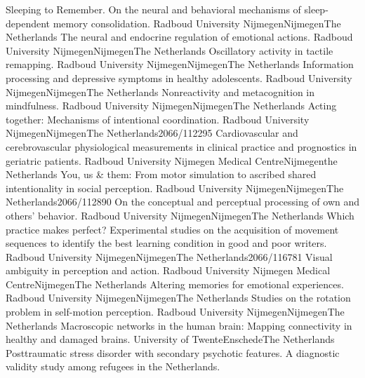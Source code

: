 	{Sleeping to Remember. On the neural and behavioral mechanisms of sleep-dependent memory consolidation.}
	{Radboud University Nijmegen}{Nijmegen}{The Netherlands}{}
	{The neural and endocrine regulation of emotional actions.}
	{Radboud University Nijmegen}{Nijmegen}{The Netherlands}{}
	{Oscillatory activity in tactile remapping.}
	{Radboud University Nijmegen}{Nijmegen}{The Netherlands}{}
	{Information processing and depressive symptoms in healthy adolescents.}
	{Radboud University Nijmegen}{Nijmegen}{The Netherlands}{}
	{Nonreactivity and metacognition in mindfulness.}
	{Radboud University Nijmegen}{Nijmegen}{The Netherlands}{}
	{Acting together: Mechanisms of intentional coordination.}
	{Radboud University Nijmegen}{Nijmegen}{The Netherlands}{2066/112295}
	{Cardiovascular and cerebrovascular physiological measurements in clinical practice and prognostics in geriatric patients.}
	{Radboud University Nijmegen Medical Centre}{Nijmegen}{the Netherlands}{}
	{ You, us & them: From motor simulation to ascribed shared intentionality in social perception.}
	{Radboud University Nijmegen}{Nijmegen}{The Netherlands}{2066/112890}
	{On the conceptual and perceptual processing of own and others’ behavior.}
	{Radboud University Nijmegen}{Nijmegen}{The Netherlands}{}
	{Which practice makes perfect? Experimental studies on the acquisition of movement sequences to identify the best learning condition in good and poor writers.}
	{Radboud University Nijmegen}{Nijmegen}{The Netherlands}{2066/116781}
	{Visual ambiguity in perception and action.}
	{Radboud University Nijmegen Medical Centre}{Nijmegen}{The Netherlands}{}
	{Altering memories for emotional experiences.}
	{Radboud University Nijmegen}{Nijmegen}{The Netherlands}{}
	{ Studies on the rotation problem in self-motion perception.}
	{Radboud University Nijmegen}{Nijmegen}{The Netherlands}{}
	{ Macroscopic networks in the human brain: Mapping connectivity in healthy and damaged brains.}
	{University of Twente}{Enschede}{The Netherlands}{}
	{Posttraumatic stress disorder with secondary psychotic features. A diagnostic validity study among refugees in the Netherlands.}
